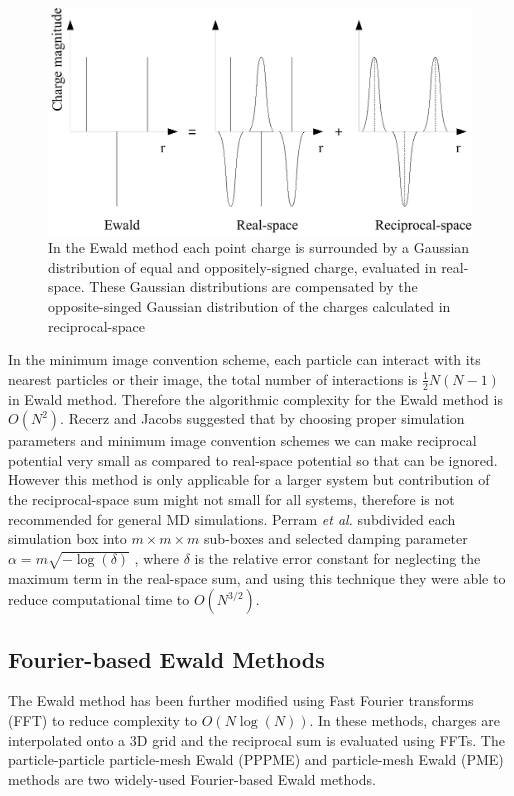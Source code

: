 \begin{figure}[tpb]
  \begin{center}
    \centerline{\includegraphics[width = \linewidth]{Ewaldsum.pdf}}
    \caption{In the Ewald method each point charge is surrounded by a Gaussian distribution of equal and oppositely-signed charge, evaluated in real-space. These Gaussian distributions are compensated by the opposite-singed Gaussian distribution of the charges calculated in reciprocal-space }
    \label{fig:Ewaldsum}
  \end{center}
\end{figure}

In the minimum image convention scheme, each particle can interact with its nearest particles or their image, the total number of interactions is $\frac{1}{2}N(N-1)$ in Ewald method. Therefore the algorithmic complexity for the Ewald method is $O(N^2)$. Recerz and Jacobs suggested that by choosing proper simulation parameters and minimum image convention schemes we can make reciprocal potential very small as compared to real-space potential so that can be ignored.\cite{Jacobs92} However this method is only applicable for a larger system but contribution of the reciprocal-space sum might not small for all systems, therefore is not recommended for general MD simulations. Perram \textit{et al.} subdivided each simulation box into $m \times m \times m$ sub-boxes and selected damping parameter $\alpha = m \sqrt{-\log(\delta)}$ , where $\delta$ is the relative error constant for neglecting the maximum term in the real-space sum, and using this technique they were able to reduce computational time   to $O(N^{3/2})$.

\subsection{Fourier-based Ewald Methods}
The Ewald method has been further modified using Fast Fourier transforms (FFT) to reduce complexity to $O(N\log(N))$. In these methods, charges are interpolated onto a 3D grid and the reciprocal sum is evaluated using FFTs. The particle-particle particle-mesh Ewald (PPPME) and particle-mesh Ewald (PME) methods are two widely-used Fourier-based Ewald methods. 


